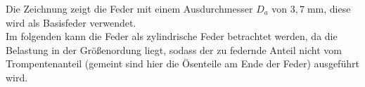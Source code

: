 \begin{center}
\end{center}
\newpage
Die Zeichnung zeigt die Feder mit einem Ausdurchmesser $D_a$ von $3,7\;\text{mm}$, diese wird
als Basisfeder verwendet.\\ 


Im folgenden kann die Feder als zylindrische Feder betrachtet werden,
da die Belastung in der Größenordung liegt, sodass der zu federnde Anteil nicht 
vom Trompentenanteil (gemeint sind hier die Ösenteile am Ende der Feder)
ausgeführt wird.

\label{sec:Durchfuehrung}